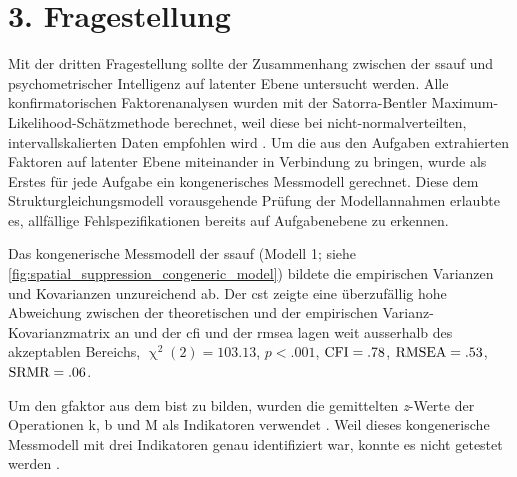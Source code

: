 \documentclass[11pt, twoside, a4paper]{book}		%
\begin{document}
\section{3. Fragestellung \label{sec:3Fragestellung}}

Mit der dritten Fragestellung sollte der Zusammenhang zwischen der \gls{ssauf} und psychometrischer Intelligenz auf latenter Ebene untersucht werden. 
Alle konfirmatorischen Faktorenanalysen wurden mit der Satorra-Bentler Maximum-Likelihood-Schätzmethode \citep{Satorra1994} berechnet, weil diese bei nicht-normal\-ver\-teilten, intervallskalierten Daten empfohlen wird \citep[z.~B.][]{Curran1996, Finney2006}.
Um die aus den Aufgaben extrahierten Faktoren auf latenter Ebene miteinander in Verbindung zu bringen, wurde als Erstes für jede Aufgabe ein kongenerisches Messmodell \citep{Joereskog1971} gerechnet. Diese dem Strukturgleichungsmodell vorausgehende Prüfung der Modellannahmen erlaubte es, allfällige Fehlspezifikationen bereits auf Aufgabenebene zu erkennen.

Das kongenerische Messmodell der \gls{ssauf} (Modell 1; siehe \autoref{fig:spatial_suppression_congeneric_model}) bildete die empirischen Varianzen und Kovarianzen unzureichend ab.  Der \gls{cst} zeigte eine überzufällig hohe Abweichung zwischen der theoretischen und der empirischen Var\-ianz-Ko\-var\-ianz\-ma\-trix an und der \gls{cfi} und der \gls{rmsea} lagen weit ausserhalb des akzeptablen Bereichs, $\upchi^2(2)=103.13$, $p<.001$, $\textnormal{CFI}=.78$, $\textnormal{RMSEA}=.53$, $\textnormal{SRMR}=.06$.

Um den \gls{gfaktor} aus dem \gls{bist} zu bilden, wurden die gemittelten \textit{z}-Werte der Operationen \gls{k}, \gls{b} und \gls{M} als Indikatoren verwendet \citep[für ein gleiches Vorgehen siehe][]{Stauffer2014}. Weil dieses kongenerische Messmodell mit drei Indikatoren genau identifiziert war, konnte es nicht getestet werden \citep[][S. 125]{Kline2011}.
\end{document}
